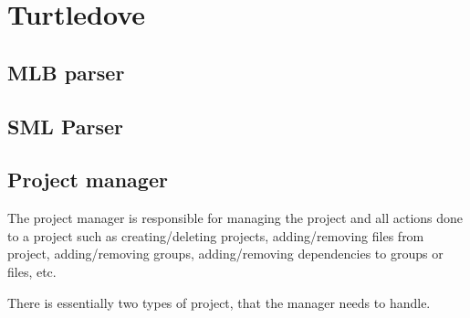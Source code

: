 
\section{Turtledove}
\label{sec:design-turtledove}


\subsection{MLB parser}
\label{sec:design-mlb-parser}

\subsection{SML Parser}
\label{sec:design-sml-parser}


\subsection{Project manager}
\label{sec:design-project-manager}



The project manager is responsible for managing the project and all actions done
to a project such as creating/deleting projects, adding/removing files from
project, adding/removing groups, adding/removing dependencies to groups or
files, etc.

There is essentially two types of project, that the manager needs to
handle.

